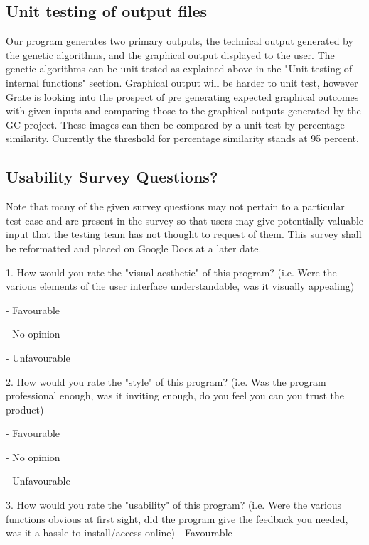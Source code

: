 \documentclass[12pt, titlepage]{article}
\begin{document}
\subsection{Unit testing of output files}		

Our program generates two primary outputs, the technical output generated by the 
genetic algorithms, and the graphical output displayed to the user. The genetic 
algorithms can be unit tested as explained above in the "Unit testing of 
internal functions" section. Graphical output will be harder to unit test, 
however Grate is looking into the prospect of pre generating expected graphical 
outcomes with given inputs and comparing those to the graphical outputs 
generated by the GC project. These images can then be compared by a unit test by 
percentage similarity. Currently the threshold for percentage similarity stands 
at 95 percent.





\newpage

\subsection{Usability Survey Questions?}
Note that many of the given survey questions may not pertain to a particular 
test case and are present in the survey so that users may give potentially 
valuable input that the testing team has not thought to request of them. This 
survey shall be reformatted and placed on Google Docs at a later date.

1. How would you rate the "visual aesthetic" of this program? (i.e. Were the 
various elements of the user interface understandable, was it visually 
appealing)

- Favourable

- No opinion

- Unfavourable

2. How would you rate the "style" of this program? (i.e. Was the program 
professional enough, was it inviting enough,  do you feel you can you trust the 
product)

- Favourable

- No opinion

- Unfavourable

3. How would you rate the "usability" of this program? (i.e. Were the various 
functions obvious at first sight, did the program give the feedback you needed, 
was it a hassle to install/access online)
- Favourable
\end{document}
